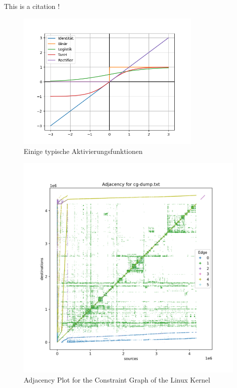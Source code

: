 This is a citation \autocite{juliani2018unity}!
\begin{figure}
    \centering
    \includegraphics[width=0.8\textwidth]{img/test.png}
    \caption{Einige typische Aktivierungsfunktionen}
    \label{fig:actfn}
\end{figure}

\begin{figure}
    \centering
    \includegraphics[width=1.\textwidth]{img/linux-consg.png}
    \caption{Adjacency Plot for the Constraint Graph of the Linux Kernel}
    \label{fig:linux-consg}
\end{figure}

